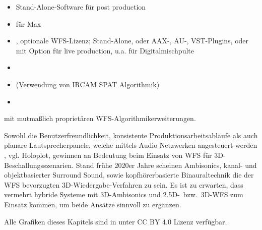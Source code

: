 \begin{itemize}
\item \cite{url:panoramix} Stand-Alone-Software für post production
\item \cite{url:spat_revolution} für Max %
\item \cite{url:flux_spat_revolution}, optionale WFS-Lizenz; Stand-Alone, oder AAX-, AU-, VST-Plugins, oder mit Option für live production, u.a. für Digitalmischpulte %
\item \cite{url:iosono} %
\item \cite{url:amadeus_holophonix} (Verwendung von IRCAM SPAT Algorithmik) %
\item \cite{url:holoplot} %
\end{itemize}
mit mutmaßlich proprietären WFS-Algorithmikerweiterungen.



Sowohl die Benutzerfreundlichkeit,
konsistente Produktionsarbeitsabläufe als auch planare Lautsprecherpanele,
welche mittels Audio-Netzwerken angesteuert werden \cite{Reussner2013_JAES},
vgl. Holoplot, gewinnen an Bedeutung beim Einsatz von WFS für 3D-Beschallungsszenarien.
%
Stand frühe 2020er Jahre scheinen Ambisonics, kanal- und objektbasierter Surround Sound,
sowie kopfhörerbasierte Binauraltechnik
die der WFS bevorzugten 3D-Wiedergabe-Verfahren zu sein.
%
Es ist zu erwarten, dass vermehrt hybride Systeme mit 3D-Ambisonics und 2.5D-~bzw.~3D-WFS
zum Einsatz kommen, um beide Ansätze sinnvoll zu ergänzen.



\vspace{\baselineskip}Alle Grafiken dieses Kapitels sind in \cite{SchultzHahnSpors2023} unter CC BY 4.0 Lizenz verfügbar.
